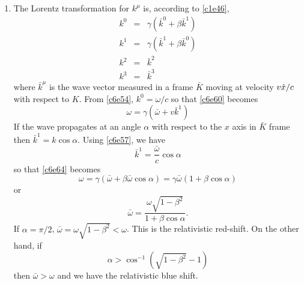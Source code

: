 \begin{enumerate}
\item The Lorentz transformation for $k^\mu$ is, according to \eqref{c1e46},
\begin{eqnarray}
k^0 &=& \gamma(\bar{k}^0 + \beta\bar{k}^1) \label{c6e60} \\
k^1 &=& \gamma(\bar{k}^1 + \beta\bar{k}^0) \label{c6e61} \\
k^2 &=& \bar{k}^2 \label{c6e62} \\
k^3 &=& \bar{k}^3 \label{c6e63}
\end{eqnarray}
where $\bar{k}^\mu$ is the wave vector measured in a frame $\bar{K}$ moving
at velocity $v\hat{x}/c$ with respect to $K$. From \eqref{c6e54}, $k^0=\omega/c$
so that \eqref{c6e60} becomes
\begin{equation}\label{c6e64}
\omega = \gamma(\bar{\omega} + v\bar{k}^1)
\end{equation}
If the wave propagates at an angle $\alpha$ with respect to the $x$ axis in 
$\bar{K}$ frame then $\bar{k}^1 = k\cos\alpha$. Using \eqref{c6e57}, we have
\begin{equation}\label{c6e65}
\bar{k}^1 = \frac{\bar{\omega}}{c}\cos\alpha
\end{equation}
so that \eqref{c6e64} becomes
\[
\omega = \gamma(\bar{\omega} + \beta\bar{\omega}\cos\alpha) = 
\gamma\bar{\omega}(1 + \beta\cos\alpha)
\]
or
\begin{equation}\label{c6e66}
\bar{\omega} = \frac{\omega\sqrt{1 - \beta^2}}{1 + \beta\cos\alpha}.
\end{equation}
If $\alpha = \pi/2$, $\bar{\omega} = \omega\sqrt{1 - \beta^2} < \omega$. This 
is the relativistic red-shift. On the other hand, if 
\[
\alpha > \cos^{-1}(\sqrt{1 - \beta^2} - 1)
\]
then $\bar{\omega} > \omega$ and we have the relativistic blue shift.


\end{enumerate}
